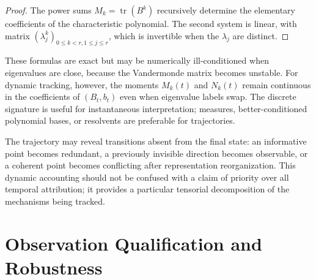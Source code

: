 \documentclass[10pt,a4paper]{article}
\newcommand{\tr}{\operatorname{tr}}
\begin{document}
\begin{proof}
The power sums $M_k=\tr(B^k)$ recursively determine the elementary coefficients of the characteristic polynomial. The second system is linear, with matrix $(\lambda_j^k)_{0\le k<r,1\le j\le r}$, which is invertible when the $\lambda_j$ are distinct.
\end{proof}
These formulas are exact but may be numerically ill-conditioned when eigenvalues are close, because the Vandermonde matrix becomes unstable. For dynamic tracking, however, the moments $M_k(t)$ and $N_k(t)$ remain continuous in the coefficients of $(B_t,b_t)$ even when eigenvalue labels swap. The discrete signature is useful for instantaneous interpretation; measures, better-conditioned polynomial bases, or resolvents are preferable for trajectories.

The trajectory may reveal transitions absent from the final state: an informative point becomes redundant, a previously invisible direction becomes observable, or a coherent point becomes conflicting after representation reorganization. This dynamic accounting should not be confused with a claim of priority over all temporal attribution; it provides a particular tensorial decomposition of the mechanisms being tracked.

\section{Observation Qualification and Robustness}
\end{document}
